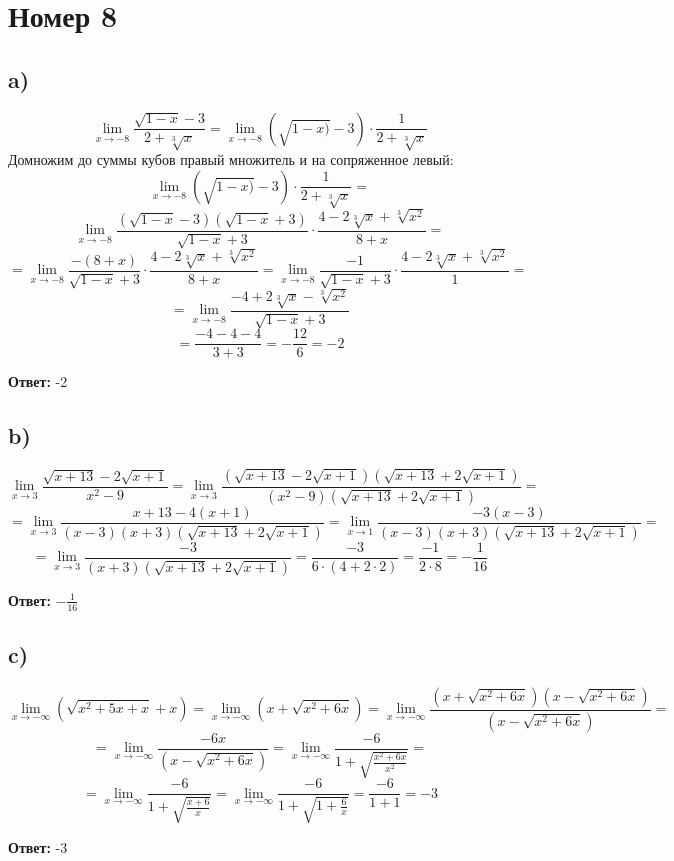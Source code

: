 \documentclass[a4paper,12pt]{article}
\begin{document}
\section*{Номер 8}
\subsection*{a)}
\[
\lim_{x \rightarrow -8} \frac{\sqrt{1-x} - 3}{2 + \sqrt[3]{x}} = \lim_{x \rightarrow -8}  \left( \sqrt{1-x)} - 3 \right) \cdot \frac{1}{2+\sqrt[3]{x}}
\]
Домножим до суммы кубов правый множитель и на сопряженное левый:
\[
\lim_{x \rightarrow -8}  \left( \sqrt{1-x)} - 3 \right) \cdot \frac{1}{2+\sqrt[3]{x}}
= \] 
\[
\lim_{x \rightarrow -8}  \frac{(\sqrt{1-x}-3)(\sqrt{1-x}+3)}{\sqrt{1-x} + 3} \cdot \frac{4-2\sqrt[3]{x} + \sqrt[3]{x^2}}{8 + x} = 
\]
\[
= 	\lim_{x \rightarrow -8}  \frac{-(8+x)}{\sqrt{1-x} + 3} \cdot \frac{4-2\sqrt[3]{x} + \sqrt[3]{x^2}}{8 + x} =  \lim_{x \rightarrow -8}  \frac{-1}{\sqrt{1-x} + 3} \cdot \frac{4-2\sqrt[3]{x} + \sqrt[3]{x^2}}{1} = \]
\[
= 
\lim_{x \rightarrow -8}  \frac{-4+2 \sqrt[3]{x} -  \sqrt[3]{x^2}}{\sqrt{1-x} + 3}
\] 
\[
= \frac{-4 -4 - 4}{3 +3}= -\frac{12}{6} = -2
\]
\begin{center}
\textbf{Ответ:} -2
\end{center}
\subsection*{b)}
\[
\lim_{x \rightarrow 3} \frac{\sqrt{x+13} - 2\sqrt{x+1}}{x^2 -9} =  \lim_{x \rightarrow 3} \frac{(\sqrt{x+13} - 2\sqrt{x+1})(\sqrt{x+13} + 2 \sqrt{x+1})}{(x^2 -9)(\sqrt{x+13} + 2\sqrt{x+1})} =
\]
\[
= \lim_{x \rightarrow 3} \frac{x+13 -4(x+1)}{(x-3)(x+3)(\sqrt{x+13} + 2 \sqrt{x+1})} = \lim_{x \rightarrow 1} \frac{-3(x -  3) }{(x-3)(x+3)(\sqrt{x+13} + 2 \sqrt{x+1})} = 
\]
\[
=\lim_{x \rightarrow 3} \frac{-3}{(x+3)(\sqrt{x+13} + 2 \sqrt{x+1})} = \frac{-3}{6 \cdot (4 + 2 \cdot 2)} = \frac{-1}{2 \cdot 8} = -\frac{1}{16}
\]
\begin{center}
\textbf{Ответ:} $-\frac{1}{16}$
\end{center}
\newpage
\subsection*{c)}
\[
\lim_{x \rightarrow -\infty} (\sqrt{x^2 + 5x + x} + x) = \lim_{x \rightarrow -\infty} (x + \sqrt{x^2+6x})= \lim_{x \rightarrow -\infty} \frac{(x + \sqrt{x^2 + 6x} )(x - \sqrt{x^2 + 6x} )}{(x - \sqrt{x^2 + 6x})} =
\] 
\[
= \lim_{x \rightarrow -\infty} \frac{-6x}{(x  - \sqrt{x^2 + 6x} )} = \lim_{x \rightarrow -\infty} \frac{-6}{1 + \sqrt{\frac{x^2 + 6x}{x^2}}} = 
\]
\[
= \lim_{x \rightarrow -\infty} \frac{-6}{1 + \sqrt{\frac{x+6}{x}}} = \lim_{x \rightarrow -\infty} \frac{-6}{1 + \sqrt{1 + \frac{6}{x}}} = \frac{-6}{1 + 1} = -3
\]
\begin{center}
\textbf{Ответ:} -3
\end{center}
\end{document}
